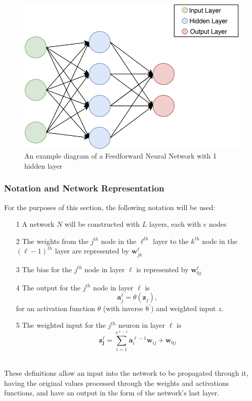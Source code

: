 \documentclass[a4paper,11pt,oneside]{article}
\theoremstyle{plain}
\theoremstyle{definition}
\begin{document}
	\begin{figure}[H]
		\centering 
		\includegraphics[scale=0.5]{images/implementation/neural_network_diagram.png}
		\caption[Feedforward Neural Network Diagram]{An example diagram of a Feedforward Neural Network with 1 hidden layer}
		\label{figure-neural_network_diagram}
	\end{figure}		
	
	\subsubsection{Notation and Network Representation}\label{imp_ffn_functions}
	
	For the purposes of this section, the following notation will be used:
	
	\begin{itemize}
		\item[1] A network $N$ will be constructed with $L$ layers, each with $e$ nodes
		\item[2] The weights from the $j^{th}$ node in the $\ell^{th}$ layer to the $k^{th}$ node in the $(\ell-1)^{th}$ layer are represented by $\mathbf{w}^\ell_{jk}$
		\item[3] The bias for the $j^{th}$ node in layer $\ell$ is represented by $\mathbf{w}^\ell_{0j}$
		\item[4] The output for the $j^{th}$ node in layer $\ell$ is 
		\begin{equation}\label{eq_activation_output}
		\mathbf{a}^\ell_j = \theta(\mathbf{z}_j) ,
		\end{equation} 
		for an activation function $\theta$ (with inverse $\mathrm{\theta^{\prime}}$) and weighted input $z$.
		\item[5] The weighted input for the $j^{th}$ neuron in layer $\ell$ is 
		\begin{equation}\label{eq_weighted_input}
		\mathbf{z^\ell_j}=\sum_{i=1}^{e^{\ell-1}}{\mathbf{a}^{\ell-1}_i\mathbf{w}_{ij}} + \mathbf{w}_{0j}
		\end{equation}
	\end{itemize}
	~\\
	These definitions allow an input into the network to be propagated through it, having the original values processed through the weights and activations functions, and have an output in the form of the network's last layer.
	
\end{document}
